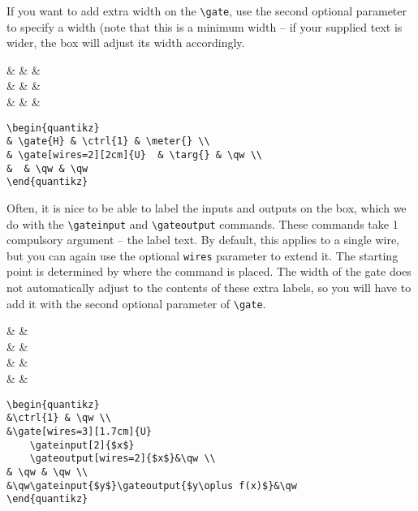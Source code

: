 \documentclass[aps,pra,10pt,nofootinbib]{revtex4}
\begin{document}
If you want to add extra width on the \verb!\gate!, use the second optional parameter to specify a width (note that this is a minimum width -- if your supplied text is wider, the box will adjust its width accordingly.
\begin{Code}
\begin{center}
\begin{quantikz}
&  &  & \meter{} \\
&   & \targ{} & \qw \\
&  & \qw & \qw
\end{quantikz}
\end{center}
\tcblower
\begin{lstlisting}
\begin{quantikz}
& \gate{H} & \ctrl{1} & \meter{} \\
& \gate[wires=2][2cm]{U}  & \targ{} & \qw \\
&  & \qw & \qw
\end{quantikz}
\end{lstlisting}
\end{Code}
Often, it is nice to be able to label the inputs and outputs on the box, which we do with the \verb!\gateinput! and \verb!\gateoutput! commands. These commands take 1 compulsory argument -- the label text. By default, this applies to a single wire, but you can again use the optional \verb!wires! parameter to extend it. The starting point is determined by where the command is placed. The width of the gate does not automatically adjust to the contents of these extra labels, so you will have to add it with the second optional parameter of \verb!\gate!.
\begin{Code}
\begin{center}
\begin{quantikz}
& & \qw \\
&
	&\qw \\
& & \qw \\
&
&\qw
\end{quantikz}
\end{center}
\tcblower
\begin{lstlisting}
\begin{quantikz}
&\ctrl{1} & \qw \\
&\gate[wires=3][1.7cm]{U}
	\gateinput[2]{$x$}
	\gateoutput[wires=2]{$x$}&\qw \\
& \qw & \qw \\
&\qw\gateinput{$y$}\gateoutput{$y\oplus f(x)$}&\qw
\end{quantikz}
\end{lstlisting}
\end{Code}
\end{document}
